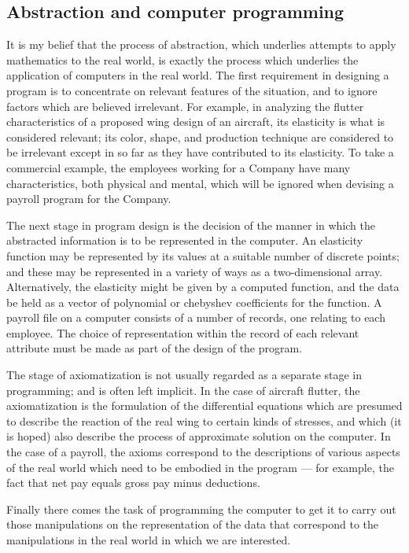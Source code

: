 \subsection{Abstraction and computer programming}

It is my belief that the process of abstraction, which underlies attempts to apply mathematics to the real world, is exactly the process which underlies the application of computers in the real world. The first requirement in designing a program is to concentrate on relevant features of the situation, and to ignore factors which are believed irrelevant. For example, in analyzing the flutter characteristics of a proposed wing design of an aircraft, its elasticity is what is considered relevant; its color, shape, and production technique are considered to be irrelevant except in so far as they have contributed to its elasticity. To take a commercial example, the employees working for a Company have many characteristics, both physical and mental, which will be ignored when devising a payroll program for the Company.

The next stage in program design is the decision of the manner in which the abstracted information is to be represented in the computer. An elasticity function may be represented by its values at a suitable number of discrete points; and these may be represented in a variety of ways as a two-dimensional array. Alternatively, the elasticity might be given by a computed function, and the data be held as a vector of polynomial or chebyshev coefficients for the function. A payroll file on a computer consists of a number of records, one relating to each employee. The choice of representation within the record of each relevant attribute must be made as part of the design of the program.

The stage of axiomatization is not usually regarded as a separate stage in programming; and is often left implicit. In the case of aircraft flutter, the axiomatization is the formulation of the differential equations which are presumed to describe the reaction of the real wing to certain kinds of stresses, and which (it is hoped) also describe the process of approximate solution on the computer. In the case of a payroll, the axioms correspond to the descriptions of various aspects of the real world which need to be embodied in the program --- for example, the fact that net pay equals gross pay minus deductions.

Finally there comes the task of programming the computer to get it to carry out those manipulations on the representation of the data that correspond to the manipulations in the real world in which we are interested. 

